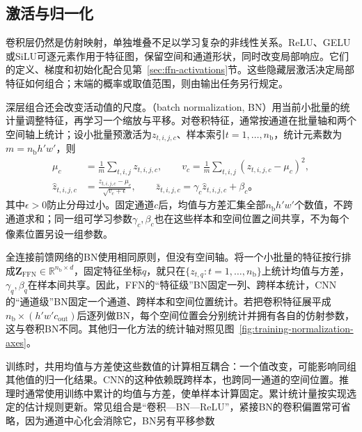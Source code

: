 \subsection{激活与归一化}
\label{sec:cnn-activation-normalization}

卷积层仍然是仿射映射，单独堆叠不足以学习复杂的非线性关系。ReLU、GELU或SiLU可逐元素作用于特征图，保留空间和通道形状，同时改变局部响应。它们的定义、梯度和初始化配合见第~\ref{sec:ffn-activations}节。这些隐藏层激活决定局部特征如何组合；末端的概率或取值范围，则由输出任务另行规定。

深层组合还会改变活动值的尺度。（batch normalization, BN）用当前小批量的统计量调整特征，再学习一个缩放与平移。对卷积特征，通常按通道在批量轴和两个空间轴上统计；设小批量预激活为$z_{t,i,j,c}$、样本索引$t=1,\ldots,n_{\mathrm b}$，统计元素数为$m=n_{\mathrm b}h'w'$，则
\begin{equation}
  \begin{aligned}
    \mu_c&=\frac1m\sum_{t,i,j}z_{t,i,j,c},\qquad
    v_c=\frac1m\sum_{t,i,j}(z_{t,i,j,c}-\mu_c)^2,\\
    \widehat z_{t,i,j,c}&=\frac{z_{t,i,j,c}-\mu_c}{\sqrt{v_c+\epsilon}},\qquad
    \bar z_{t,i,j,c}=\gamma_c\widehat z_{t,i,j,c}+\beta_c\text{。}
  \end{aligned}
  \label{eq:cnn-batch-normalization}
\end{equation}
其中$\epsilon>0$防止分母过小。固定通道$c$后，均值与方差汇集全部$n_{\mathrm b}h'w'$个数值，不跨通道求和；同一组可学习参数$\gamma_c,\beta_c$也在这些样本和空间位置之间共享，不为每个像素位置另设一组参数。

全连接前馈网络的BN使用相同原则，但没有空间轴。将一个小批量的特征按行排成$\bm Z_{\mathrm{FFN}}\in\mathbb R^{n_{\mathrm b}\times d}$，固定特征坐标$q$，就只在$\{z_{t,q}:t=1,\ldots,n_{\mathrm b}\}$上统计均值与方差，$\gamma_q,\beta_q$在样本间共享。因此，FFN的“特征级”BN固定一列、跨样本统计，CNN的“通道级”BN固定一个通道、跨样本和空间位置统计。若把卷积特征展平成$n_{\mathrm b}\times(h'w'c_{\mathrm{out}})$后逐列做BN，每个空间位置会分别统计并拥有各自的仿射参数，这与卷积BN不同。其他归一化方法的统计轴对照见图~\ref{fig:training-normalization-axes}。

训练时，共用均值与方差使这些数值的计算相互耦合：一个值改变，可能影响同组其他值的归一化结果。CNN的这种依赖既跨样本，也跨同一通道的空间位置。推理时通常使用训练中累计的均值与方差，使单样本计算固定。累计统计量按实现选定的估计规则更新。常见组合是“卷积—BN—ReLU”，紧接BN的卷积偏置常可省略，因为通道中心化会消除它，BN另有平移参数


